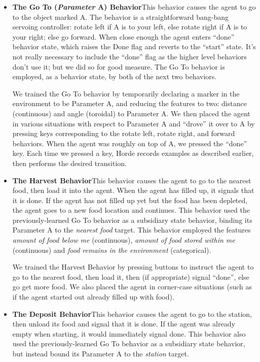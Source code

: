 \documentclass[11pt]{article}
\begin{document}
\begin{itemize}
\item {\bf The Go To ({\it\textbf{Parameter}} A) Behavior}\quad This behavior causes the agent to go to the object marked A.  The behavior is a straightforward bang-bang servoing controller: rotate left if A is to your left, else rotate right if A is to your right; else go forward.  When close enough the agent enters ``done'' behavior state, which raises the Done flag and reverts to the ``start'' state.  It's not really necessary to include the ``done'' flag as the higher level behaviors don't use it; but we did so for good measure.  The Go To behavior is employed, as a behavior state, by both of the next two behaviors.

We trained the Go To behavior by temporarily declaring a marker in the environment to be Parameter A, and reducing the features to two: distance (continuous) and angle (toroidal) to Parameter A.  We then placed the agent in various situations with respect to Parameter A and ``drove'' it over to A by pressing keys corresponding to the rotate left, rotate right, and forward behaviors.  When the agent was roughly on top of A, we pressed the ``done'' key.  Each time we pressed a key, Horde records examples as described earlier, then performs the desired transition. 

\item {\bf The Harvest Behavior}\quad This behavior causes the agent to go to the nearest food, then load it into the agent.  When the agent has filled up, it signals that it is done.  If the agent has not filled up yet but the food has been depleted, the agent goes to a new food location and continues.  This behavior used the previously-learned Go To behavior as a subsidiary state behavior, binding its Parameter A to the {\it nearest food} target.  This behavior employed the features {\it amount of food below me} (continuous), {\it amount of food stored within me} (continuous) and {\it food remains in the environment} (categorical).  

We trained the Harvest Behavior by pressing buttons to instruct the agent to go to the nearest food, then load it, then (if appropriate) signal ``done'', else go get more food.  We also placed the agent in corner-case situations (such as if the agent started out already filled up with food).

\item {\bf The Deposit Behavior}\quad This behavior causes the agent to go to the station, then unload its food and signal that it is done.  If the agent was already empty when starting, it would immediately signal done.   This behavior also used the previously-learned Go To behavior as a subsidiary state behavior, but instead bound its Parameter A to the {\it station} target.


\end{itemize}
\end{document}

